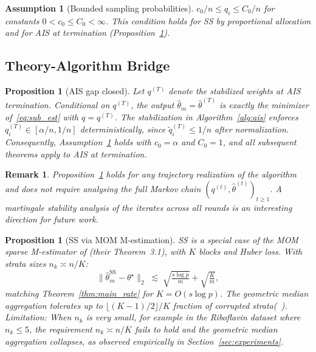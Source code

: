 \documentclass[10pt]{article}
\newtheorem{proposition}[theorem]{Proposition}
\newtheorem{remark}[theorem]{Remark}
\newtheorem{assumption}{Assumption}
\newcommand{\hth}{\hat{\theta}}
\newcommand{\ts}{\theta^{\star}}
\begin{document}
\begin{assumption}[Bounded sampling probabilities]\label{assump:bounded_q}
$c_0/n\le q_i\le C_0/n$ for constants $0<c_0\le C_0<\infty$.
This condition holds for SS by proportional allocation and for AIS at termination
(Proposition~\ref{prop:ais_gap}).
\end{assumption}

\subsection{Theory-Algorithm Bridge}

\begin{proposition}[AIS gap closed]\label{prop:ais_gap}
Let $q^{(T)}$ denote the stabilized weights at AIS termination.
Conditional on $q^{(T)}$, the output $\hth_m=\hth^{(T)}$ is exactly the
minimizer of~\eqref{eq:sub_est} with $q=q^{(T)}$.
The stabilization in Algorithm~\ref{alg:ais} enforces
$q_i^{(T)}\in[\alpha/n,1/n]$ deterministically, since
$\tilde q_i^{(T)}\le1/n$ after normalization. Consequently,
Assumption~\ref{assump:bounded_q} holds with $c_0=\alpha$ and $C_0=1$,
and all subsequent theorems apply to AIS at termination.
\end{proposition}

\begin{remark}
Proposition~\ref{prop:ais_gap} holds for any trajectory realization of the
algorithm and does not require analysing the full Markov chain
$(q^{(t)},\hth^{(t)})_{t\ge1}$. A martingale stability analysis of the
iterates across all rounds is an interesting direction for future work.
\end{remark}

\begin{proposition}[SS via MOM M-estimation]\label{prop:ss_mom}
SS is a special case of the MOM sparse M-estimator of
\citet{lecue2020robust} (their Theorem~3.1), with $K$ blocks and
Huber loss. With strata sizes $n_k\asymp n/K$:
\begin{equation}\label{eq:ss_rate}
  \|\hth_m^{\mathrm{SS}}-\ts\|_2
  \;\lesssim\;
  \sqrt{\tfrac{s\log p}{m}}+\sqrt{\tfrac{K}{m}},
\end{equation}
matching Theorem~\ref{thm:main_rate} for $K=O(s\log p)$.
The geometric median aggregation tolerates up to $\lfloor(K-1)/2\rfloor/K$ fraction
of corrupted strata(~\cite{lugosi2019mean}).
\emph{Limitation:} When $n_k$ is very small, for example in the Riboflavin
dataset where $n_k\le5$, the requirement $n_k\asymp n/K$ fails to hold and
the geometric median aggregation collapses, as observed empirically in
Section~\ref{sec:experiments}.
\end{proposition}
\end{document}
